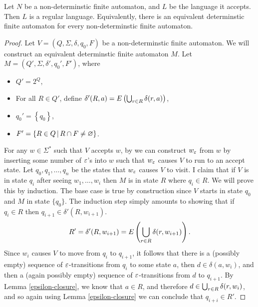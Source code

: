 \begin{thm}\label{dfa-nfa-equivalence}
    Let $N$ be a non-determinstic finite automaton, and $L$ be the language it accepts. Then $L$ is a regular language. Equivalently, there is an equivalent determinstic finite automaton for every non-determinstic finite automaton.
\end{thm}

\begin{proof}
    Let $V = \left(Q, \Sigma, \delta, q_0, F\right)$ be a non-determinstic finite automaton. We will construct an equivalent determinstic finite automaton $M$. Let $M = \left(Q', \Sigma, \delta', q_0', F'\right)$, where
    \begin{itemize}
        \item $Q' = 2^Q$,
        \item For all $R \in Q'$, define $\delta'(R, a) = E\left(\bigcup_{r \in R}\delta(r, a)\right)$,
        \item $q_0' = \left\{q_0\right\}$,
        \item $F' = \left\{R \in Q \,\middle|\, R \cap F \neq \varnothing\right\}$.
    \end{itemize}

    For any $w \in \Sigma^*$ such that $V$ accepts $w$, by we can construct $w_{\varepsilon}$ from $w$ by inserting some number of $\varepsilon$'s into $w$ such that $w_{\varepsilon}$ causes $V$ to run to an accept state. Let $q_0, q_1, \ldots, q_n$ be the states that $w_{\varepsilon}$ causes $V$ to visit. I claim that if $V$ is in state $q_i$ after seeing $w_1, \ldots, w_i$ then $M$ is in state $R$ where $q_i \in R$. We will prove this by induction. The base case is true by construction since $V$ starts in state $q_0$ and $M$ in state $\{q_0\}$. The induction step simply amounts to showing that if $q_i \in R$ then $q_{i+1} \in \delta'(R, w_{i+1})$.
    \begin{align*}
        R' = \delta'(R, w_{i+1}) = E\left(\bigcup_{r\in R}\delta(r, w_{i+1})\right).
    \end{align*}
    Since $w_i$ causes $V$ to move from $q_i$ to $q_{i+1}$, it follows that there is a (possibly empty) sequence of $\varepsilon$-transitions from $q_i$ to some state $a$, then $d \in \delta(a, w_i)$, and then a (again possibly empty) sequence of $\varepsilon$-transitions from $d$ to $q_{i+1}$. By Lemma \ref{epsilon-closure}, we know that $a \in R$, and therefore $d \in \bigcup_{r \in R}\delta(r, w_i)$, and so again using Lemma \ref{epsilon-closure} we can conclude that $q_{i+i} \in R'$.


\end{proof}
